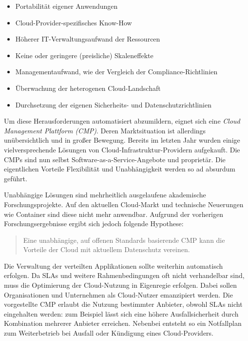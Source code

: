 \begin{itemize}
	\item Portabilität eigener Anwendungen
	\item Cloud-Provider-spezifisches Know-How
	\item Höherer IT-Verwaltungsaufwand der Ressourcen
	\item Keine oder geringere (preisliche) Skaleneffekte
	\item Managementaufwand, wie der Vergleich der Compliance-Richtlinien
	\item Überwachung der heterogenen Cloud-Landschaft
	\item Durchsetzung der eigenen Sicherheits- und Datenschutzrichtlinien
\end{itemize}

\noindent
Um diese Herausforderungen automatisiert abzumildern, eignet sich eine \emph{Cloud Management Plattform (CMP)}. Deren Marktsituation ist allerdings unübersichtlich und in großer Bewegung. Bereits im letzten Jahr wurden einige vielversprechende Lösungen von Cloud-Infrastruktur-Providern aufgekauft. Die CMPs sind nun selbst Software-as-a-Service-Angebote und proprietär. Die eigentlichen Vorteile Flexibilität und Unabhängigkeit werden so ad absurdum geführt.

Unabhängige Lösungen sind mehrheitlich ausgelaufene akademische Forschungsprojekte. Auf den aktuellen Cloud-Markt und technische Neuerungen wie Container sind diese nicht mehr anwendbar. Aufgrund der vorherigen Forschungsergebnisse ergibt sich jedoch folgende Hypothese:


\begin{verse}
{Eine unabhängige, auf offenen Standards basierende CMP kann die Vorteile der Cloud mit aktuellem Datenschutz vereinen.}
\end{verse}

\noindent Die Verwaltung der verteilten Applikationen sollte weiterhin automatisch erfolgen. Da SLAs und weitere Rahmenbedingungen oft nicht verhandelbar sind, muss die Optimierung der Cloud-Nutzung in Eigenregie erfolgen. Dabei sollen Organisationen und Unternehmen als Cloud-Nutzer emanzipiert werden. Die vorgestellte CMP erlaubt die Nutzung bestimmter Anbieter, obwohl SLAs  nicht eingehalten werden: zum Beispiel lässt sich eine höhere Ausfallsicherheit durch Kombination mehrerer Anbieter erreichen. Nebenbei entsteht so ein Notfallplan zum Weiterbetrieb bei Ausfall oder Kündigung eines Cloud-Providers.

